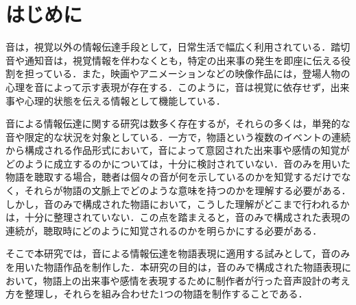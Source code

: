 
\section{はじめに}
音は，視覚以外の情報伝達手段として，日常生活で幅広く利用されている．踏切音や通知音は，視覚情報を伴わなくとも，特定の出来事の発生を即座に伝える役割を担っている．また，映画やアニメーションなどの映像作品には，登場人物の心理を音によって示す表現が存在する．このように，音は視覚に依存せず，出来事や心理的状態を伝える情報として機能している．

音による情報伝達に関する研究は数多く存在するが，それらの多くは，単発的な音や限定的な状況を対象としている．一方で，物語という複数のイベントの連続から構成される作品形式において，音によって意図された出来事や感情の知覚がどのように成立するのかについては，十分に検討されていない．音のみを用いた物語を聴取する場合，聴者は個々の音が何を示しているのかを知覚するだけでなく，それらが物語の文脈上でどのような意味を持つのかを理解する必要がある．しかし，音のみで構成された物語において，こうした理解がどこまで行われるかは，十分に整理されていない．この点を踏まえると，音のみで構成された表現の連続が，聴取時にどのように知覚されるのかを明らかにする必要がある．

そこで本研究では，音による情報伝達を物語表現に適用する試みとして，音のみを用いた物語作品を制作した．本研究の目的は，音のみで構成された物語表現において，物語上の出来事や感情を表現するために制作者が行った音声設計の考え方を整理し，それらを組み合わせた1つの物語を制作することである．
